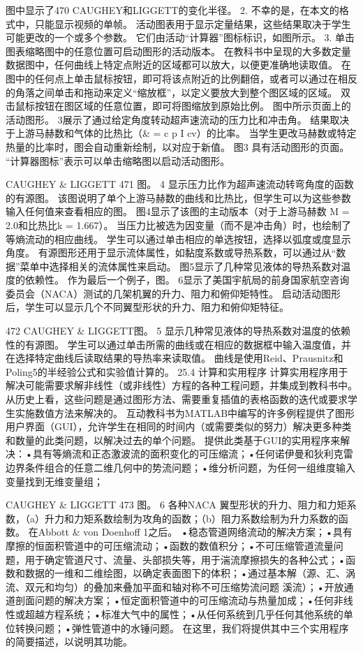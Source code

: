 \documentclass[UTF8,11pt,a4paper,openany,fontset=fandol]{ctexbook}
\begin{document}
图中显示了470 CAUGHEY和LIGGETT的变化半径。 2. 不幸的是，在本文的格式中，只能显示视频的单帧。 活动图表用于显示定量结果，这些结果取决于学生可能更改的一个或多个参数。 它们由活动“计算器”图标标识，如图所示。 3. 单击图表缩略图中的任意位置可启动图形的活动版本。 在教科书中呈现的大多数定量数据图中，任何曲线上特定点附近的区域都可以放大，以便更准确地读取值。 在图中的任何点上单击鼠标按钮，即可将该点附近的比例翻倍，或者可以通过在相反的角落之间单击和拖动来定义“缩放框”，以定义要放大到整个图区域的区域。 双击鼠标按钮在图区域的任意位置，即可将图缩放到原始比例。 图中所示页面上的活动图形。 3展示了通过给定角度转动超声速流动的压力比和冲击角。 结果取决于上游马赫数和气体的比热比（\& = c p I cv）的比率。 当学生更改马赫数或特定热量的比率时，图会自动重新绘制，以对应于新值。 图3 具有活动图形的页面。 “计算器图标”表示可以单击缩略图以启动活动图形。

CAUGHEY \& LIGGETT 471 图。 4 显示压力比作为超声速流动转弯角度的函数的有源图。 该图说明了单个上游马赫数的曲线和比热比，但学生可以为这些参数输入任何值来查看相应的图。 图4显示了该图的主动版本（对于上游马赫数 M = 2.0和比热比k = 1.667）。 当压力比被选为因变量（而不是冲击角）时，也绘制了等熵流动的相应曲线。 学生可以通过单击相应的单选按钮，选择以弧度或度显示角度。 有源图形还用于显示流体属性，如黏度系数或导热系数，可以通过从“数据”菜单中选择相关的流体属性来启动。 图5显示了几种常见液体的导热系数对温度的依赖性。 作为最后一个例子，图。 6显示了美国宇航局的前身国家航空咨询委员会（NACA）测试的几架机翼的升力、阻力和俯仰矩特性。 启动活动图形后，学生可以显示几个不同翼型形状的升力、阻力和俯仰矩特征。

472 CAUGHEY \& LIGGETT图。 5 显示几种常见液体的导热系数对温度的依赖性的有源图。 学生可以通过单击所需的曲线或在相应的数据框中输入温度值，并在选择特定曲线后读取结果的导热率来读取值。 曲线是使用Reid、Prausnitz和Poling5的半经验公式和实验值计算的。 25.4 计算和实用程序 计算实用程序用于解决可能需要求解非线性（或非线性）方程的各种工程问题，并集成到教科书中。 从历史上看，这些问题是通过图形方法、需要重复插值的表格函数的迭代或要求学生实施数值方法来解决的。 互动教科书为MATLAB中编写的许多例程提供了图形用户界面（GUI），允许学生在相同的时间内（或需要类似的努力）解决更多种类和数量的此类问题，以解决过去的单个问题。 提供此类基于GUI的实用程序来解决：•具有等熵流和正态激波流的面积变化的可压缩流；•任何诺伊曼和狄利克雷边界条件组合的任意二维几何中的势流问题；•维分析问题，为任何一组维度输入变量找到无维变量组；

CAUGHEY \& LIGGETT 473 图。 6 各种NACA 翼型形状的升力、阻力和力矩系数，（a）升力和力矩系数绘制为攻角的函数；（b）阻力系数绘制为升力系数的函数。 在Abbott \& von Doenhoff 1之后。 •稳态管道网络流动的解决方案；•具有摩擦的恒面积管道中的可压缩流动；•函数的数值积分；•不可压缩管道流量问题，用于确定管道尺寸、流量、头部损失等，用于湍流摩擦损失的各种公式；•函数和数据的一维和二维绘图，以确定表面图下的体积；•通过基本解（源、汇、涡流、双元和均匀）的叠加来叠加平面和轴对称不可压缩势流问题 溪流）；•开放通道剖面问题的解决方案；•恒定面积管道中的可压缩流动与热量加成；•任何非线性或超越方程系统；•标准大气中的属性；•从任何系统到几乎任何其他系统的单位转换问题；•弹性管道中的水锤问题。 在这里，我们将提供其中三个实用程序的简要描述，以说明其功能。
\end{document}
